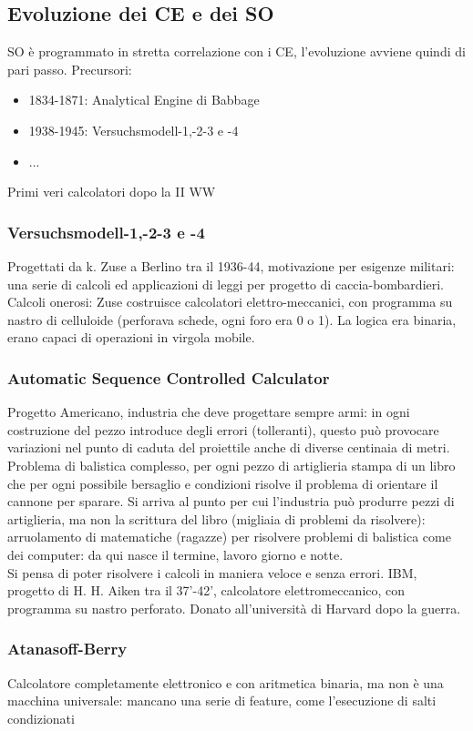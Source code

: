 \documentclass[12pt, oneside]{extbook}
\begin{document}
\subsection{Evoluzione dei CE e dei SO}
SO è programmato in stretta correlazione con i CE, l'evoluzione avviene quindi di pari passo. Precursori:
\begin{itemize}
\item 1834-1871: Analytical Engine di Babbage
\item 1938-1945: Versuchsmodell-1,-2-3 e -4
\item ...
\end{itemize}
Primi veri calcolatori dopo la II WW
\subsubsection{Versuchsmodell-1,-2-3 e -4}
Progettati da k. Zuse a Berlino tra il 1936-44, motivazione per esigenze militari: una serie di calcoli ed applicazioni di leggi per progetto di caccia-bombardieri. Calcoli onerosi: Zuse costruisce calcolatori elettro-meccanici, con programma su nastro di celluloide (perforava schede, ogni foro era 0 o 1). La logica era binaria, erano capaci di operazioni in virgola mobile.
\subsubsection{Automatic Sequence Controlled Calculator}
Progetto Americano, industria che deve progettare sempre armi: in ogni costruzione del pezzo introduce degli errori (tolleranti), questo può provocare variazioni nel punto di caduta del proiettile anche di diverse centinaia di metri. Problema di balistica complesso, per ogni pezzo di artiglieria stampa di un libro che per ogni possibile bersaglio e condizioni risolve il problema di orientare il cannone per sparare. Si arriva al punto per cui l'industria può produrre pezzi di artiglieria, ma non la scrittura del libro (migliaia di problemi da risolvere): arruolamento di matematiche (ragazze) per risolvere problemi di balistica come dei computer: da qui nasce il termine, lavoro giorno e notte.\\ Si pensa di poter risolvere i calcoli in maniera veloce e senza errori. IBM, progetto di H. H. Aiken tra il 37'-42', calcolatore elettromeccanico, con programma su nastro perforato. Donato all'università di Harvard dopo la guerra.
\subsubsection{Atanasoff-Berry}
Calcolatore completamente elettronico e con aritmetica binaria, ma non è una macchina universale: mancano una serie di feature, come l'esecuzione di salti condizionati
\end{document}
